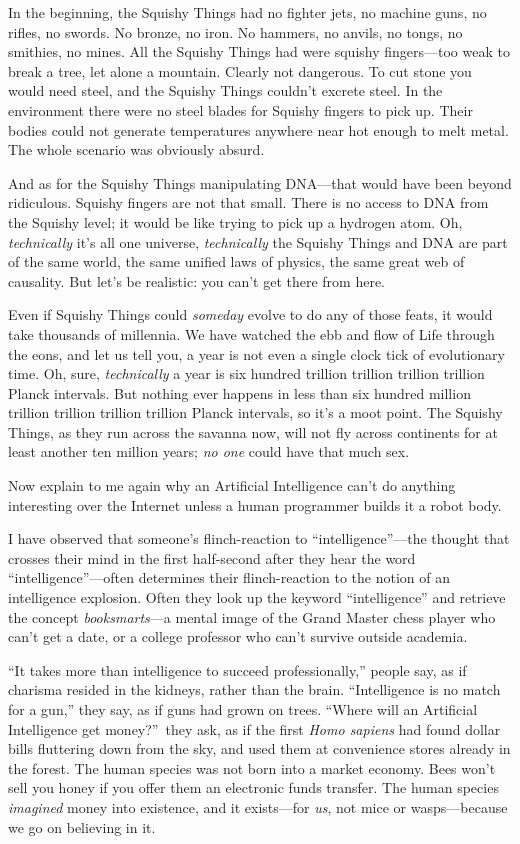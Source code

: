  In the beginning, the Squishy Things had no fighter jets, no
machine guns, no rifles, no swords. No bronze, no iron. No hammers, no
anvils, no tongs, no smithies, no mines. All the Squishy Things had
were squishy fingers---too weak to break a tree, let alone a mountain.
Clearly not dangerous. To cut stone you would need steel, and the
Squishy Things couldn't excrete steel. In the
environment there were no steel blades for Squishy fingers to pick up.
Their bodies could not generate temperatures anywhere near hot enough
to melt metal. The whole scenario was obviously absurd.


 And as for the Squishy Things manipulating DNA---that would have
been beyond ridiculous. Squishy fingers are not that small. There is no
access to DNA from the Squishy level; it would be like trying to pick
up a hydrogen atom. Oh, \textit{technically} it's all
one universe, \textit{technically} the Squishy Things and DNA are part
of the same world, the same unified laws of physics, the same great web
of causality. But let's be realistic: you
can't get there from here.


 Even if Squishy Things could \textit{someday} evolve to do any of
those feats, it would take thousands of millennia. We have watched the
ebb and flow of Life through the eons, and let us tell you, a year is
not even a single clock tick of evolutionary time. Oh, sure,
\textit{technically} a year is six hundred trillion trillion trillion
trillion Planck intervals. But nothing ever happens in less than six
hundred million trillion trillion trillion trillion Planck intervals,
so it's a moot point. The Squishy Things, as they run
across the savanna now, will not fly across continents for at least
another ten million years; \textit{no one} could have that much sex.


 Now explain to me again why an Artificial Intelligence
can't do anything interesting over the Internet unless
a human programmer builds it a robot body.


 I have observed that someone's flinch-reaction to
``intelligence''---the thought that
crosses their mind in the first half-second after they hear the word
``intelligence''---often determines
their flinch-reaction to the notion of an intelligence explosion. Often
they look up the keyword
``intelligence'' and retrieve the
concept \textit{booksmarts}{}---a mental image of the Grand Master
chess player who can't get a date, or a college
professor who can't survive outside academia.


 ``It takes more than intelligence to succeed
professionally,'' people say, as if charisma resided
in the kidneys, rather than the brain. ``Intelligence
is no match for a gun,'' they say, as if guns had
grown on trees. ``Where will an Artificial
Intelligence get money?''~they ask, as if the first
\textit{Homo sapiens} had found dollar bills fluttering down from the
sky, and used them at convenience stores already in the forest. The
human species was not born into a market economy. Bees
won't sell you honey if you offer them an electronic
funds transfer. The human species \textit{imagined} money into
existence, and it exists---for \textit{us}, not mice or wasps---because
we go on believing in it.


